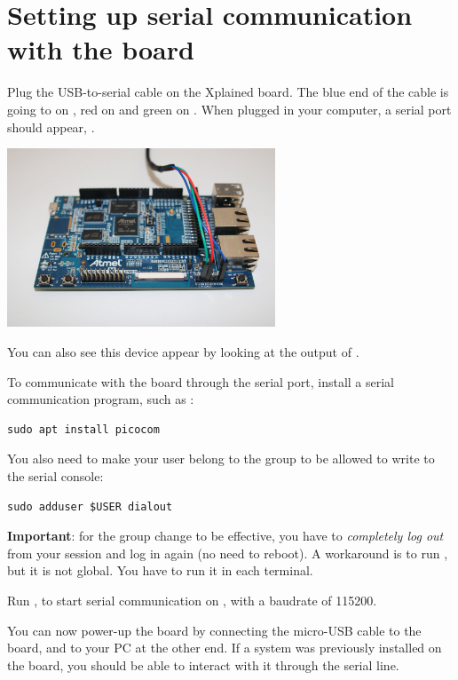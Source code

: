 \section{Setting up serial communication with the board}

Plug the USB-to-serial cable on the Xplained board. The blue end of
the cable is going to  on , red on  and
green on . When plugged in your computer, a serial port
should appear, .

\begin{center}
\includegraphics[width=8cm]{labs/sysdev-u-boot/xplained-serial-connector.jpg}
\end{center}

You can also see this device appear by looking at the output of
.

To communicate with the board through the serial port, install a
serial communication program, such as :

\begin{verbatim}
sudo apt install picocom
\end{verbatim}

You also need to make your user belong to the  group to be
allowed to write to the serial console:

\begin{verbatim}
sudo adduser $USER dialout
\end{verbatim}

{\bf Important}: for the group change to be effective, you have to
{\em completely log out} from your session and log in again (no need to
reboot). A workaround is to run , but it is not global.
You have to run it in each terminal.

Run , to start serial
communication on , with a baudrate of 115200.

You can now power-up the board by connecting the micro-USB cable to
the board, and to your PC at the other end. If a system was previously
installed on the board, you should be able to interact with it
through the serial line.

